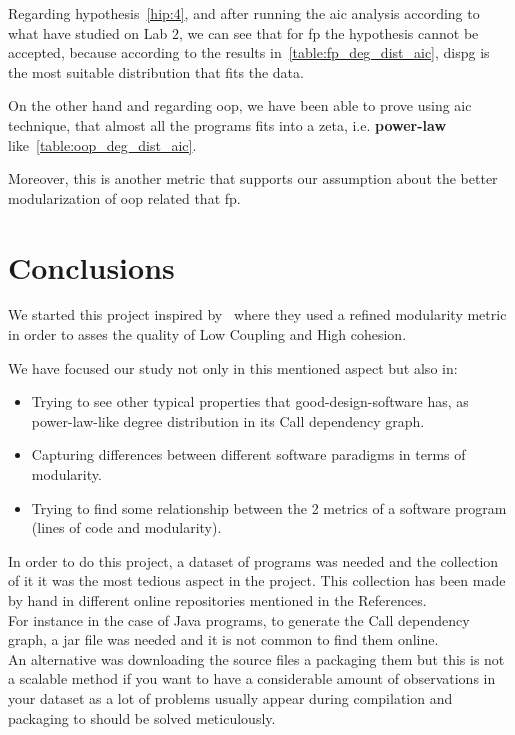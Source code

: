 \documentclass[12pt, a4paper]{article}
\begin{document}
Regarding hypothesis~\ref{hip:4}, and after running the \acrlong{aic} analysis according to what have studied on Lab $2$, we can see that for \acrlong{fp} the hypothesis cannot be accepted,
because according to the results in~\ref{table:fp_deg_dist_aic}, \acrlong{dispg} is the most suitable distribution that fits the data.

On the other hand and regarding \acrlong{oop}, we have been able to prove using \acrlong{aic} technique, that almost all the programs fits into a \acrlong{zeta}, i.e. \textbf{power-law} like~\ref{table:oop_deg_dist_aic}.

Moreover, this is another metric that supports our assumption about the better modularization of \acrlong{oop} related that \acrlong{fp}.

\section{Conclusions}

We started this project inspired by~\cite{cohesion_coupling} where they used a refined modularity metric in order to asses the quality of Low Coupling and High cohesion.

We have focused our study not only in this mentioned aspect but also in:

\begin{itemize}
  \item Trying to see other typical properties that good-design-software has, as power-law-like degree distribution in its Call dependency graph.
  \item Capturing differences between different software paradigms in terms of modularity.
  \item Trying to find some relationship between the 2 metrics of a software program (lines of code and modularity).
\end{itemize}

In order to do this project, a dataset of programs was needed and the collection of it it was the most tedious aspect in the project. This collection has been made by hand in different online repositories mentioned in the References. \\
For instance in the case of Java programs, to generate the Call dependency graph, a jar file was needed and it is not common to find them online.\\ An alternative was downloading the source files a packaging them but this is not a scalable method if you want to have a considerable amount of observations in your dataset as a lot of problems usually appear during compilation and packaging to should be solved meticulously. 
\end{document}
